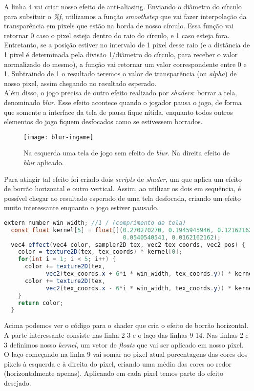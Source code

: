 A linha 4 vai criar nosso efeito de anti-aliasing. Enviando o diâmetro do círculo para subsituir o \textit{\%f}, utilizamos a função \textit{smoothstep} que vai fazer interpolação da transparência em pixels que estão na borda de nosso círculo. Essa função vai retornar 0 caso o pixel esteja dentro do raio do círculo, e 1 caso esteja fora. Entretanto, se a posição estiver no intervalo de 1 pixel desse raio (e a distância de 1 pixel é determinada pela divisão 1/diâmetro do círculo, para receber o valor normalizado do mesmo), a função vai retornar um valor correspondente entre 0 e 1. Subtraindo de 1 o resultado teremos o valor de transparência (ou \textit{alpha}) de nosso pixel, assim chegando no resultado esperado.\\


Além disso, o jogo precisa de outro efeito realizado por \textit{shaders}: borrar a tela, denominado \textit{blur}. Esse efeito acontece quando o jogador pausa o jogo, de forma que somente a interface da tela de pausa fique nítida, enquanto todos outros elementos do jogo fiquem desfocados como se estivessem borrados.

\begin{figure}[h]
\texttt{[image: blur-ingame]}
\centering
\caption{Na esquerda uma tela de jogo sem efeito de \textit{blur}. Na direita efeito de \textit{blur} aplicado.}
\end{figure}

Para atingir tal efeito foi criado dois \textit{scripts} de \textit{shader}, um que aplica um efeito de borrão horizontal e outro vertical. Assim, ao utilizar os dois em sequência, é possível chegar ao resultado esperado de uma tela desfocada, criando um efeito muito interessante enquanto o jogo estiver pausado.

\begin{lstlisting}[language=java]
  extern number win_width; //1 / (comprimento da tela)
  const float kernel[5] = float[](0.270270270, 0.1945945946, 0.1216216216,
                                  0.0540540541, 0.0162162162);
  vec4 effect(vec4 color, sampler2D tex, vec2 tex_coords, vec2 pos) {
    color = texture2D(tex, tex_coords) * kernel[0];
    for(int i = 1; i < 5; i++) {
      color += texture2D(tex,
            vec2(tex_coords.x + 6*i * win_width, tex_coords.y)) * kernel[i];
      color += texture2D(tex,
            vec2(tex_coords.x - 6*i * win_width, tex_coords.y)) * kernel[i];
    }
    return color;
  }
\end{lstlisting}

Acima podemos ver o código para o shader que cria o efeito de borrão horizontal. A parte interessante consiste nas linha 2-3 e o laço das linhas 9-14. Nas linhas 2 e 3 definimos nosso \textit{kernel}, um vetor de \textit{floats} que vai ser aplicado em nosso pixel. O laço começando na linha 9 vai somar ao pixel atual porcentagens das cores dos pixels à esquerda e à direita do pixel, criando uma média das cores ao redor (horizontalmente apenas). Aplicando em cada pixel temos parte do efeito desejado.

